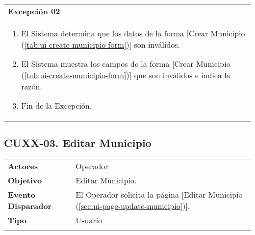 \begin{tabular}{ p{15.5cm} }
	\textbf{Excepción 02} \\
	\begin{enumerate}
		\item El Sistema determina que los datos de la forma [Crear Municipio (\ref{tab:ui-create-municipio-form})] son inválidos.
		\item El Sistema muestra los campos de la forma [Crear Municipio (\ref{tab:ui-create-municipio-form})] que son inválidos e indica la razón.
		\item Fin de la Excepción.
	\end{enumerate}
\end{tabular}


\clearpage
\subsection{CUXX-03. Editar Municipio} \label{sec:cu-update-Municipio}

\begin{tabular}{ p{3.5cm} p{11.5cm} }
	\textbf{Actores} & Operador\\
	\textbf{Objetivo} & Editar Municipio.\\
	\textbf{Evento Disparador} & El Operador solicita la página [Editar Municipio (\ref{sec:ui-page-update-municipio})].\\
	\textbf{Tipo} & Usuario\\
	\\
\end{tabular}

